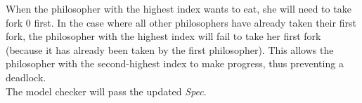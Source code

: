 When the philosopher with the highest index wants to eat, she will need to take
fork 0 first. In the case where all other philosophers have already taken their
first fork, the philosopher with the highest index will fail to take her first
fork (because it has already been taken by the first philosopher). This allows
the philosopher with the second-highest index to make progress, thus preventing a
deadlock.\\

The model checker will pass the updated \textit{Spec}.

% 
